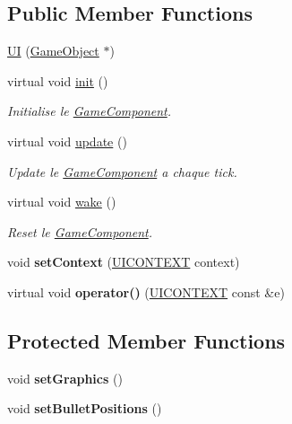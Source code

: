 \subsection*{Public Member Functions}
\begin{DoxyCompactItemize}
\item 
\hyperlink{class_u_i_ab299e77b21896655f94ef84c727a4e22}{UI} (\hyperlink{class_game_object}{Game\+Object} $\ast$)
\item 
\hypertarget{class_u_i_a2277decc2cba013de2fbb5a64fbc1543}{}\label{class_u_i_a2277decc2cba013de2fbb5a64fbc1543} 
virtual void \hyperlink{class_u_i_a2277decc2cba013de2fbb5a64fbc1543}{init} ()
\begin{DoxyCompactList}\small\item\em Initialise le \hyperlink{class_game_component}{Game\+Component}. \end{DoxyCompactList}\item 
\hypertarget{class_u_i_a47c96192a9924bbd6c6b610922770988}{}\label{class_u_i_a47c96192a9924bbd6c6b610922770988} 
virtual void \hyperlink{class_u_i_a47c96192a9924bbd6c6b610922770988}{update} ()
\begin{DoxyCompactList}\small\item\em Update le \hyperlink{class_game_component}{Game\+Component} a chaque tick. \end{DoxyCompactList}\item 
\hypertarget{class_u_i_ae16be0e89513445e6a75e7cd92ba6d90}{}\label{class_u_i_ae16be0e89513445e6a75e7cd92ba6d90} 
virtual void \hyperlink{class_u_i_ae16be0e89513445e6a75e7cd92ba6d90}{wake} ()
\begin{DoxyCompactList}\small\item\em Reset le \hyperlink{class_game_component}{Game\+Component}. \end{DoxyCompactList}\item 
\hypertarget{class_u_i_a09ee528ce56244fb5205dfaf0fbe6c22}{}\label{class_u_i_a09ee528ce56244fb5205dfaf0fbe6c22} 
void {\bfseries set\+Context} (\hyperlink{struct_u_i_c_o_n_t_e_x_t}{U\+I\+C\+O\+N\+T\+E\+XT} context)
\item 
\hypertarget{class_u_i_a7a1beee6c64d0fce1f6e4dc720b08ea3}{}\label{class_u_i_a7a1beee6c64d0fce1f6e4dc720b08ea3} 
virtual void {\bfseries operator()} (\hyperlink{struct_u_i_c_o_n_t_e_x_t}{U\+I\+C\+O\+N\+T\+E\+XT} const \&e)
\end{DoxyCompactItemize}
\subsection*{Protected Member Functions}
\begin{DoxyCompactItemize}
\item 
\hypertarget{class_u_i_a2f93274796ee43d83145b042b1844b93}{}\label{class_u_i_a2f93274796ee43d83145b042b1844b93} 
void {\bfseries set\+Graphics} ()
\item 
\hypertarget{class_u_i_a626a653f29b66e351efe58085001ad87}{}\label{class_u_i_a626a653f29b66e351efe58085001ad87} 
void {\bfseries set\+Bullet\+Positions} ()
\end{DoxyCompactItemize}
